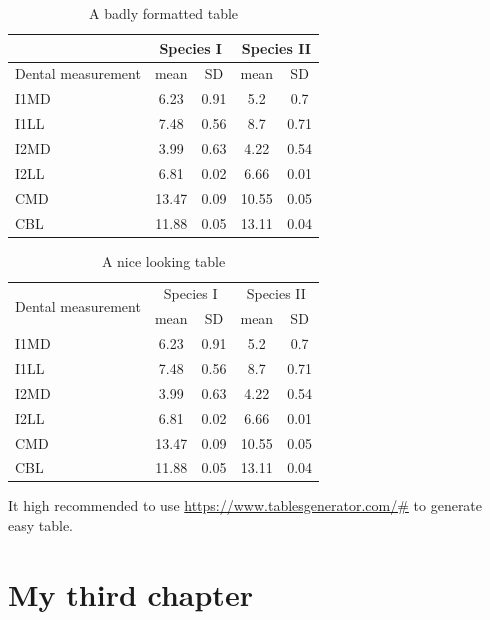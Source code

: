 \begin{table}[H]
\caption{A badly formatted table}
\centering
\label{table:bad_table}
\begin{tabular}{|l|c|c|c|c|}
\hline 
& \multicolumn{2}{c}{Species I} & \multicolumn{2}{c|}{Species II} \\ 
\hline
Dental measurement  & mean & SD  & mean & SD  \\ \hline 
\hline
I1MD & 6.23 & 0.91 & 5.2  & 0.7  \\
\hline 
I1LL & 7.48 & 0.56 & 8.7  & 0.71 \\
\hline 
I2MD & 3.99 & 0.63 & 4.22 & 0.54 \\
\hline 
I2LL & 6.81 & 0.02 & 6.66 & 0.01 \\
\hline 
CMD & 13.47 & 0.09 & 10.55 & 0.05 \\
\hline 
CBL & 11.88 & 0.05 & 13.11 & 0.04\\ 
\hline 
\end{tabular}
\end{table}



\begin{table}[H]
\caption{A nice looking table}
\centering
\label{table:nice_table}
\begin{tabular}{l c c c c}
\hline 
\multirow{2}{*}{Dental measurement} & \multicolumn{2}{c}{Species I} & \multicolumn{2}{c}{Species II} \\ 
\cline{2-5}
  & mean & SD  & mean & SD  \\ 
\hline
I1MD & 6.23 & 0.91 & 5.2  & 0.7  \\

I1LL & 7.48 & 0.56 & 8.7  & 0.71 \\

I2MD & 3.99 & 0.63 & 4.22 & 0.54 \\

I2LL & 6.81 & 0.02 & 6.66 & 0.01 \\

CMD & 13.47 & 0.09 & 10.55 & 0.05 \\

CBL & 11.88 & 0.05 & 13.11 & 0.04\\ 
\hline 
\end{tabular}
\end{table}


It high recommended to use {\url{https://www.tablesgenerator.com/#}} to generate easy table.




\chapter{My third chapter}

